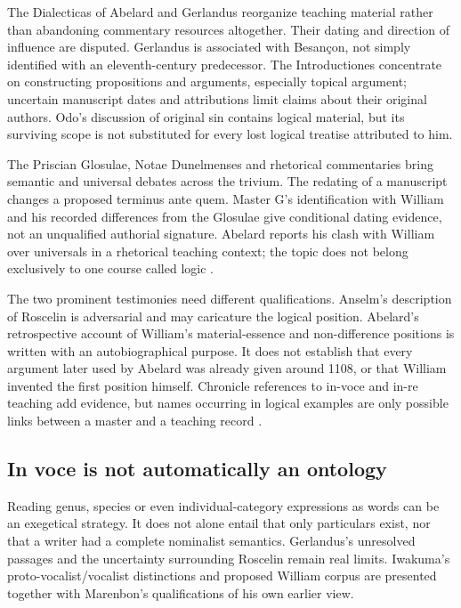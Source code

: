 The Dialecticas of Abelard and Gerlandus reorganize teaching material
rather than abandoning commentary resources altogether.
Their dating and direction of influence are disputed.
Gerlandus is associated with Besançon, not simply identified
with an eleventh-century predecessor. The Introductiones
concentrate on constructing propositions and arguments,
especially topical argument; uncertain manuscript dates and
attributions limit claims about their original authors.
Odo's discussion of original sin contains logical material,
but its surviving scope is not substituted for every lost
logical treatise attributed to him.

The Priscian Glosulae, Notae Dunelmenses and rhetorical commentaries
bring semantic and universal debates across the trivium.
The redating of a manuscript changes a proposed terminus ante quem.
Master G's identification with William and his recorded differences
from the Glosulae give conditional dating evidence, not an
unqualified authorial signature.
Abelard reports his clash with William over universals in a
rhetorical teaching context; the topic does not belong exclusively
to one course called logic
\cite[pp.~70--73]{Marenbon2007FordhamTurnTwelfth}.

The two prominent testimonies need different qualifications.
Anselm's description of Roscelin is adversarial and may caricature
the logical position. Abelard's retrospective account of William's
material-essence and non-difference positions is written with
an autobiographical purpose. It does not establish that every
argument later used by Abelard was already given around 1108,
or that William invented the first position himself.
Chronicle references to in-voce and in-re teaching add evidence,
but names occurring in logical examples are only possible links
between a master and a teaching record
\cite[pp.~73--75]{Marenbon2007FordhamTurnTwelfth}.

\subsection{In voce is not automatically an ontology}

Reading genus, species or even individual-category expressions
as words can be an exegetical strategy. It does not alone entail
that only particulars exist, nor that a writer had a complete
nominalist semantics. Gerlandus's unresolved passages and
the uncertainty surrounding Roscelin remain real limits.
Iwakuma's proto-vocalist/vocalist distinctions and proposed
William corpus are presented together with Marenbon's
qualifications of his own earlier view.

